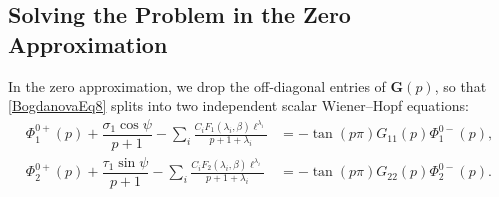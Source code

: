\subsection{Solving the Problem in the Zero Approximation}
In the zero approximation, we drop the off‐diagonal entries of $\mathbf G(p)$, so that \eqref{BogdanovaEq8} splits into two independent scalar Wiener–Hopf equations:
\begin{equation}\label{BogdanovaEq9}
	\begin{array}{ll}
		\Phi_{1}^{0+}(p)
		+\dfrac{\sigma_{1}\cos\psi}{p+1}
		-\displaystyle\sum_{i}\frac{C_{i}F_{1}(\lambda_{i},\beta) \ell^{\lambda_{i}}}{p+1+\lambda_{i}}
		&=-\tan(p\pi) G_{11}(p) \Phi_{1}^{0-}(p),
		\\
		\Phi_{2}^{0+}(p)
		+\dfrac{\tau_{1}\sin\psi}{p+1}
		-\displaystyle\sum_{i}\frac{C_{i}F_{2}(\lambda_{i},\beta) \ell^{\lambda_{i}}}{p+1+\lambda_{i}}
		&=-\tan(p\pi)G_{22}(p) \Phi_{2}^{0-}(p).
	\end{array}
\end{equation}

